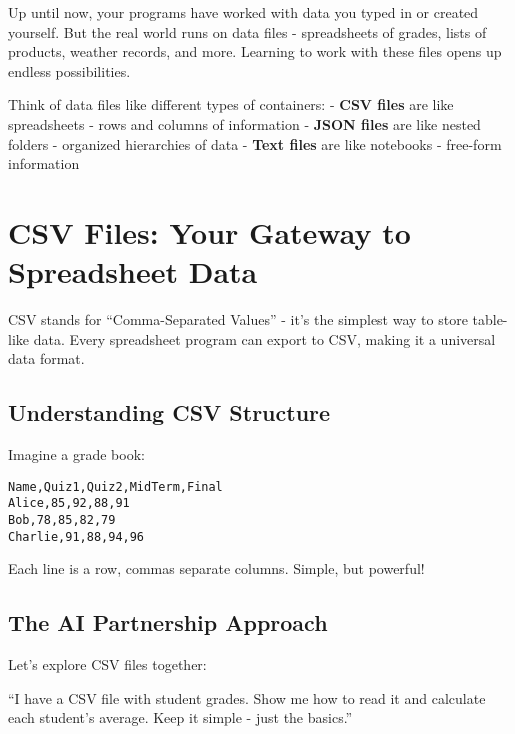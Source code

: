 \documentclass[
  letterpaper,
  DIV=11,
  numbers=noendperiod,
  oneside]{scrreprt}
\begin{document}
Up until now, your programs have worked with data you typed in or
created yourself. But the real world runs on data files - spreadsheets
of grades, lists of products, weather records, and more. Learning to
work with these files opens up endless possibilities.

Think of data files like different types of containers: - \textbf{CSV
files} are like spreadsheets - rows and columns of information -
\textbf{JSON files} are like nested folders - organized hierarchies of
data - \textbf{Text files} are like notebooks - free-form information

\section{CSV Files: Your Gateway to Spreadsheet
Data}\label{csv-files-your-gateway-to-spreadsheet-data}

CSV stands for ``Comma-Separated Values'' - it's the simplest way to
store table-like data. Every spreadsheet program can export to CSV,
making it a universal data format.

\subsection{Understanding CSV
Structure}\label{understanding-csv-structure}

Imagine a grade book:

\begin{verbatim}
Name,Quiz1,Quiz2,MidTerm,Final
Alice,85,92,88,91
Bob,78,85,82,79
Charlie,91,88,94,96
\end{verbatim}

Each line is a row, commas separate columns. Simple, but powerful!

\subsection{The AI Partnership
Approach}\label{the-ai-partnership-approach}

Let's explore CSV files together:

\begin{tcolorbox}[enhanced jigsaw, opacityback=0, colback=white, colframe=quarto-callout-tip-color-frame, breakable, titlerule=0mm, coltitle=black, rightrule=.15mm, colbacktitle=quarto-callout-tip-color!10!white, left=2mm, bottomtitle=1mm, bottomrule=.15mm, title=\textcolor{quarto-callout-tip-color}{\faLightbulb}\hspace{0.5em}{Prompt Engineering for CSV}, opacitybacktitle=0.6, toptitle=1mm, leftrule=.75mm, arc=.35mm, toprule=.15mm]

``I have a CSV file with student grades. Show me how to read it and
calculate each student's average. Keep it simple - just the basics.''

\end{tcolorbox}
\end{document}
